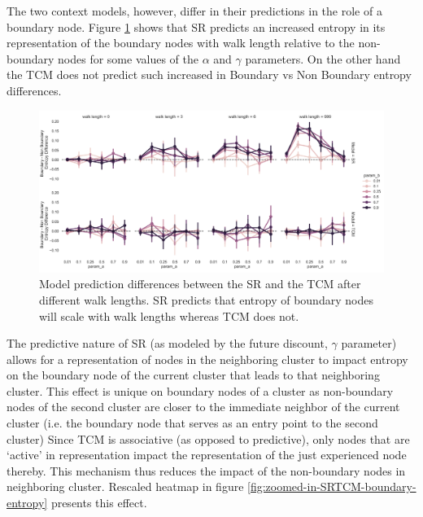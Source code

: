 The two context models, however, differ in their predictions in the role of a boundary node. Figure \ref{fig:SR-TCM-walklength-boundary-nonboundary-entropydiff} shows that SR predicts an increased entropy in its representation of the boundary nodes with walk length relative to the non-boundary nodes for some values of the $\alpha$ and $\gamma$ parameters. On the other hand the TCM does not predict such increased in Boundary vs Non Boundary entropy differences. 
\begin{figure}[ht]
	\centering
	\includegraphics[width = \textwidth]{chapter_notebooks/chapter_2/figures/SR_TCM_walklength_boundary_nonboundary_entropydiff.png}
	\caption{Model prediction differences between the SR and the TCM after different walk lengths. SR predicts that entropy of boundary nodes will scale with walk lengths whereas TCM does not.}
	\label{fig:SR-TCM-walklength-boundary-nonboundary-entropydiff}
\end{figure}


The predictive nature of SR (as modeled by the future discount, $\gamma$ parameter) allows for a representation of nodes in the neighboring cluster to impact entropy on the boundary node of the current cluster that leads to that neighboring cluster. This effect is unique on boundary nodes of a cluster as non-boundary nodes of the second cluster are closer to the immediate neighbor of the current cluster (i.e. the boundary node that serves as an entry point to the second cluster) Since TCM is associative (as opposed to predictive), only nodes that are `active' in representation impact the representation of the just experienced node thereby. This mechanism thus reduces the impact of the non-boundary nodes in neighboring cluster. Rescaled heatmap in figure \ref{fig:zoomed-in-SRTCM-boundary-entropy} presents this effect.

